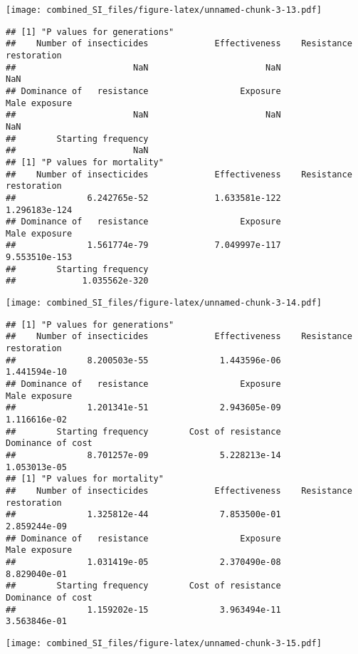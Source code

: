 \documentclass[
]{article}
\begin{document}
\texttt{[image: combined\_SI\_files/figure-latex/unnamed-chunk-3-13.pdf]}

\begin{verbatim}
## [1] "P values for generations"
##    Number of insecticides             Effectiveness    Resistance restoration 
##                       NaN                       NaN                       NaN 
## Dominance of   resistance                  Exposure             Male exposure 
##                       NaN                       NaN                       NaN 
##        Starting frequency 
##                       NaN 
## [1] "P values for mortality"
##    Number of insecticides             Effectiveness    Resistance restoration 
##              6.242765e-52             1.633581e-122             1.296183e-124 
## Dominance of   resistance                  Exposure             Male exposure 
##              1.561774e-79             7.049997e-117             9.553510e-153 
##        Starting frequency 
##             1.035562e-320
\end{verbatim}

\texttt{[image: combined\_SI\_files/figure-latex/unnamed-chunk-3-14.pdf]}

\begin{verbatim}
## [1] "P values for generations"
##    Number of insecticides             Effectiveness    Resistance restoration 
##              8.200503e-55              1.443596e-06              1.441594e-10 
## Dominance of   resistance                  Exposure             Male exposure 
##              1.201341e-51              2.943605e-09              1.116616e-02 
##        Starting frequency        Cost of resistance         Dominance of cost 
##              8.701257e-09              5.228213e-14              1.053013e-05 
## [1] "P values for mortality"
##    Number of insecticides             Effectiveness    Resistance restoration 
##              1.325812e-44              7.853500e-01              2.859244e-09 
## Dominance of   resistance                  Exposure             Male exposure 
##              1.031419e-05              2.370490e-08              8.829040e-01 
##        Starting frequency        Cost of resistance         Dominance of cost 
##              1.159202e-15              3.963494e-11              3.563846e-01
\end{verbatim}

\texttt{[image: combined\_SI\_files/figure-latex/unnamed-chunk-3-15.pdf]}
\end{document}
